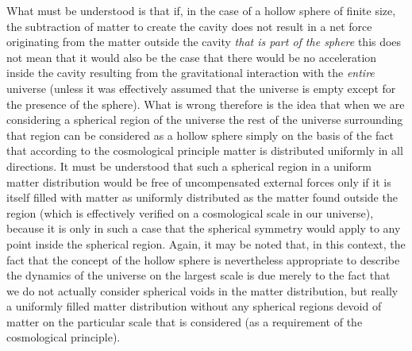 \documentclass[notitlepage,12pt]{report}
\begin{document}
What must be understood is that if, in the case of a hollow sphere of finite size, the subtraction of matter to create the cavity does not result in a net force originating from the matter outside the cavity \textit{that is part of the sphere} this does not mean that it would also be the case that there would be no acceleration inside the cavity resulting from the gravitational interaction with the \textit{entire} universe (unless it was effectively assumed that the universe is empty except for the presence of the sphere). What is wrong therefore is the idea that when we are considering a spherical region of the universe the rest of the universe surrounding that region can be considered as a hollow sphere simply on the basis of the fact that according to the cosmological principle matter is distributed uniformly in all directions. It must be understood that such a spherical region in a uniform matter distribution would be free of uncompensated external forces only if it is itself filled with matter as uniformly distributed as the matter found outside the region (which is effectively verified on a cosmological scale in our universe), because it is only in such a case that the spherical symmetry would apply to any point inside the spherical region. Again, it may be noted that, in this context, the fact that the concept of the hollow sphere is nevertheless appropriate to describe the dynamics of the universe on the largest scale is due merely to the fact that we do not actually consider spherical voids in the matter distribution, but really a uniformly filled matter distribution without any spherical regions devoid of matter on the particular scale that is considered (as a requirement of the cosmological principle).
\end{document}
